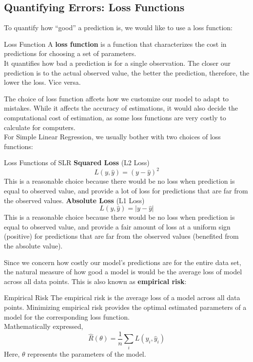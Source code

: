 \subsection{Quantifying Errors: Loss Functions}
To quantify how ``good'' a prediction is, we would like to use a loss function:
\begin{ln-define}{Loss Function}{}
    A \textbf{loss function} is a function that characterizes the cost in predictions for choosing a set of parameters. \\
    It quantifies how bad a prediction is for a single observation. The closer our prediction is to the actual observed value, the better the prediction, therefore, the lower the loss. Vice versa.
\end{ln-define}
The choice of loss function affcets how we customize our model to adapt to mistakes. While it affects the accuracy of estimations, it would also decide the computational cost of estimation, as some loss functions are very costly to calculate for computers. \\
For Simple Linear Regression, we usually bother with two choices of loss functions:
\begin{ln-define}[sidebyside]{Loss Functions of SLR}{}
    \textbf{Squared Loss} (L2 Loss) \\
    \[L(y, \hat{y}) = {(y - \hat{y})}^2\]
    This is a reasonable choice because there would be no loss when prediction is equal to observed value, and provide a lot of loss for predictions that are far from the observed values.
    \tcblower
    \textbf{Absolute Loss} (L1 Loss) \\
    \[L(y, \hat{y}) = |y - \hat{y}|\]
    This is a reasonable choice because there would be no loss when prediction is equal to observed value, and provide a fair amount of loss at a uniform sign (positive) for predictions that are far from the observed values (benefited from the absolute value).
\end{ln-define}
Since we concern how costly our model's predictions are for the entire data set, the natural measure of how good a model is would be the average loss of model across all data points. This is also known as \textbf{empirical risk}:
\begin{ln-define}{Empirical Risk}{}
    The empirical risk is the average loss of a model across all data points. Minimizing empirical risk provides the optimal estimated parameters of a model for the corresponding loss function. \\
    Mathematically expressed,
    \[\hat{R}(\theta) = \frac{1}{n} \sum_i L(y_i, \hat{y}_i)\]
    Here, $\theta$ represents the parameters of the model.
\end{ln-define}
